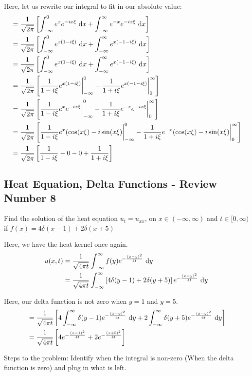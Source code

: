 Here, let us rewrite our integral to fit in our absolute value:
%
\begin{align}
  & = \frac{1}{\sqrt{2 \pi}}
  \left[
  \int^0_{-\infty} e^x e^{-i x \xi}\ \text dx +
  \int^\infty_{-\infty} e^{-x} e^{-i x \xi}\ \text dx
  \right]\\
  & = \frac{1}{\sqrt{2 \pi}}
  \left[
  \int^0_{-\infty} e^{x(1 - i \xi)}\ \text dx +
  \int^\infty_{-\infty} e^{x(-1 - i \xi)}\ \text dx
  \right]\\
  & = \frac{1}{\sqrt{2 \pi}}
  \left[
  \int^0_{-\infty} e^{x(1 - i \xi)}\ \text dx +
  \int^\infty_{-\infty} e^{x(-1 - i \xi)}\ \text dx
  \right]\\
  & = \frac{1}{\sqrt{2 \pi}}
  \left[
  \frac{1}{1 - i \xi} e^{x(1 - i \xi)} \bigg|^0_{-\infty} -
  \frac{1}{1 + i \xi} e^{x(-1 - i\xi)} \bigg|^\infty_0
  \right]\\
  & = \frac{1}{\sqrt{2 \pi}}
  \left[
  \frac{1}{1 - i \xi} e^{x} e^{-i x \xi} \bigg|^0_{-\infty} -
  \frac{1}{1 + i \xi} e^{-x}e^{-i x \xi} \bigg|^\infty_0
  \right]
  \\
  & = \frac{1}{\sqrt{2 \pi}}
  \left[
  \frac{1}{1 - i \xi} e^{x} (\cos(x \xi) - i\sin(x \xi) \bigg|^0_{-\infty} -
  \frac{1}{1 + i \xi} e^{-x}(\cos(x \xi) - i\sin(x \xi) \bigg|^\infty_0
  \right]\\
  & = \frac{1}{\sqrt{2 \pi}}
  \left[
  \frac{1}{1 - i\xi} - 0 - 0 + \frac{1}{1 + i \xi}
  \right]
\end{align}

\subsection*{Heat Equation, Delta Functions - Review Number 8}

Find the solution of the heat equation $u_t = u_{xx}$, on $x \in (-\infty, \infty)$ and $t \in [0, \infty)$ if $f(x) = 4 \delta(x - 1) + 2 \delta(x + 5)$

Here, we have the heat kernel once again.
%
\begin{align}
  u(x, t)
  & = \frac{1}{\sqrt{4 \pi t}} \int^\infty_{-\infty} f(y) e^{- \frac{(x - y)^2}{4t}}\ \text dy\\
  & = \frac{1}{\sqrt{4 \pi t}} \int^\infty_{-\infty}
  \left[
  4 \delta(y - 1) + 2 \delta(y + 5)
  \right]
  e^{-\frac{(x - y)^2}{4t}}\ \text dy
\end{align}

Here, our delta function is not zero when $y = 1$ and $y = 5$.
%
\begin{align}
  & = \frac{1}{\sqrt{4 \pi t}}
  \left[
  4 \int^\infty_{-\infty} \delta(y - 1) e^{-\frac{(x - y)^2}{4t}}\ \text dy +
  2 \int^\infty_{-\infty} \delta(y + 5) e^{-\frac{(x - y)^2}{4t}}\ \text dy
  \right]\\
  & = \frac{1}{\sqrt{4 \pi t}}
  \left[
  4 e^{- \frac{(x - 1)^2}{4t}} + 2e^{-\frac{(x + 5)^2}{4t}}
  \right]
\end{align}

Steps to the problem: Identify when the integral is non-zero (When the delta function is zero) and plug in what is left.
